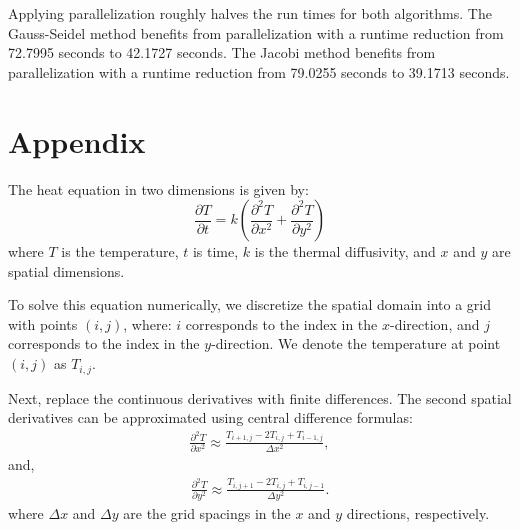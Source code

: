 \documentclass[11pt,a4paper]{article}
\begin{document}
Applying parallelization roughly halves the run times for both algorithms.
The Gauss-Seidel method benefits from parallelization with a runtime reduction from 
72.7995 seconds to 42.1727 seconds.
The Jacobi method benefits from parallelization with a runtime reduction from 
79.0255 seconds to 39.1713 seconds.

\newpage
\section{Appendix}

The heat equation in two dimensions is given by:
\begin{equation}
  \frac{\partial T}{\partial t} =
  k \left( \frac{\partial^2 T}{\partial x^2} +
  \frac{\partial^2 T}{\partial y^2} \right)
\end{equation}
where \(T\) is the temperature, \(t\) is time,
\(k\) is the thermal diffusivity,
and \(x\) and \(y\) are spatial dimensions.

To solve this equation numerically,
we discretize the spatial domain into a grid with points \((i, j)\),
where: \(i\) corresponds to the index in the \(x\)-direction,
and \(j\) corresponds to the index in the \(y\)-direction.
We denote the temperature at point \((i, j)\) as \(T_{i,j}\).

Next, replace the continuous derivatives with finite differences.
The second spatial derivatives can be approximated using central difference formulas:
\begin{align}
  \frac{\partial^2 T}{\partial x^2} \approx
  \frac{T_{i+1,j} - 2T_{i,j} + T_{i-1,j}}{\Delta x^2},
\end{align}
and,
\begin{align}
  \frac{\partial^2 T}{\partial y^2} \approx
  \frac{T_{i,j+1} - 2T_{i,j} + T_{i,j-1}}{\Delta y^2}.
\end{align}
where \(\Delta x\) and \(\Delta y\) are the grid spacings in the \(x\) and \(y\) directions,
respectively.
\end{document}
